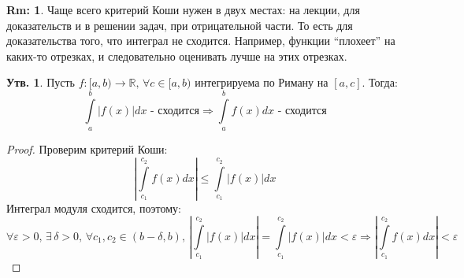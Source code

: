 \documentclass[12pt]{article}
\newcommand{\MR}{\mathbb{R}}
\newcommand{\VE}{\varepsilon}
\theoremstyle{definition}
\newtheorem{rem}{Rm:}
\newtheorem{prop}{Утв.}
\newcommand{\ddint}[2]{\displaystyle\int\limits_{#1}^{#2}}
\begin{document}
\begin{rem}
	Чаще всего критерий Коши нужен в двух местах: на лекции, для доказательств и в решении задач, при отрицательной части. То есть для доказательства того, что интеграл не сходится. Например, функции ``плохеет'' на каких-то отрезках, и следовательно оценивать лучше на этих отрезках.
\end{rem}

\begin{prop}
	Пусть $f \colon [a,b) \to \MR, \, \forall c \in [a,b)$ интегрируема по Риману на $[a,c]$. Тогда: 
	$$
		\ddint{a}{b}\left|f(x)\right|dx \text{ - сходится} \Rightarrow \ddint{a}{b}f(x)dx \text{ - сходится}
	$$
\end{prop}
\begin{proof}
	Проверим критерий Коши:
	$$
		\left|\ddint{c_1}{c_2}f(x)dx \right| \leq \ddint{c_1}{c_2}\left|f(x)\right|dx
	$$
	Интеграл модуля сходится, поэтому:
	$$
		\forall \VE > 0, \, \exists \, \delta > 0, \, \forall c_1, c_2 \in (b -\delta,b), \,  \left|\ddint{c_1}{c_2}\left|f(x) \right| dx \right| = \ddint{c_1}{c_2}\left|f(x)\right|dx < \VE \Rightarrow \left|\ddint{c_1}{c_2}f(x)dx \right| < \VE
	$$
\end{proof}
\end{document}
